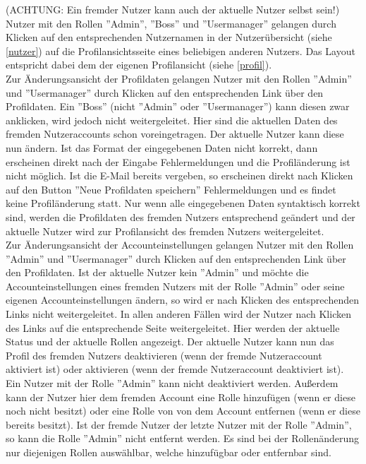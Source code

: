 \documentclass[a4paper]{article}
\begin{document}
(ACHTUNG: Ein fremder Nutzer kann auch der aktuelle Nutzer selbst sein!) \\
Nutzer mit den Rollen ''Admin'', ''Boss'' und ''Usermanager'' gelangen durch Klicken auf den entsprechenden Nutzernamen in der Nutzerübersicht (siehe \ref{nutzer}) auf die Profilansichtsseite eines beliebigen anderen Nutzers. Das Layout entspricht dabei dem der eigenen Profilansicht (siehe \ref{profil}). \\
Zur Änderungsansicht der Profildaten gelangen Nutzer mit den Rollen ''Admin'' und ''Usermanager'' durch Klicken auf den entsprechenden Link über den Profildaten. Ein ''Boss'' (nicht ''Admin'' oder ''Usermanager'') kann diesen zwar anklicken, wird jedoch nicht weitergeleitet. Hier sind die aktuellen Daten des fremden Nutzeraccounts schon voreingetragen. Der aktuelle Nutzer kann diese nun ändern. Ist das Format der eingegebenen Daten nicht korrekt, dann erscheinen direkt nach der Eingabe Fehlermeldungen und die Profiländerung ist nicht möglich. Ist die E-Mail bereits vergeben, so erscheinen direkt nach Klicken auf den Button ''Neue Profildaten speichern'' Fehlermeldungen und es findet keine Profiländerung statt. Nur wenn alle eingegebenen Daten syntaktisch korrekt sind, werden die Profildaten des fremden Nutzers entsprechend geändert und der aktuelle Nutzer wird zur Profilansicht des fremden Nutzers weitergeleitet. \\
Zur Änderungsansicht der Accounteinstellungen gelangen Nutzer mit den Rollen ''Admin'' und ''Usermanager'' durch Klicken auf den entsprechenden Link über den Profildaten. Ist der aktuelle Nutzer kein ''Admin'' und möchte die Accounteinstellungen eines fremden Nutzers mit der Rolle ''Admin'' oder seine eigenen Accounteinstellungen ändern, so wird er nach Klicken des entsprechenden Links nicht weitergeleitet. In allen anderen Fällen wird der Nutzer nach Klicken des Links auf die entsprechende Seite weitergeleitet. Hier werden der aktuelle Status und der aktuelle Rollen angezeigt. Der aktuelle Nutzer kann nun das Profil des fremden Nutzers deaktivieren (wenn der fremde Nutzeraccount aktiviert ist) oder aktivieren (wenn der fremde Nutzeraccount deaktiviert ist). Ein Nutzer mit der Rolle ''Admin'' kann nicht deaktiviert werden. Außerdem kann der Nutzer hier dem fremden Account eine Rolle hinzufügen (wenn er diese noch nicht besitzt) oder eine Rolle von von dem Account entfernen (wenn er diese bereits besitzt). Ist der fremde Nutzer der letzte Nutzer mit der Rolle ''Admin'', so kann die Rolle ''Admin'' nicht entfernt werden. Es sind bei der Rollenänderung nur diejenigen Rollen auswählbar, welche hinzufügbar oder entfernbar sind. 
\end{document}
